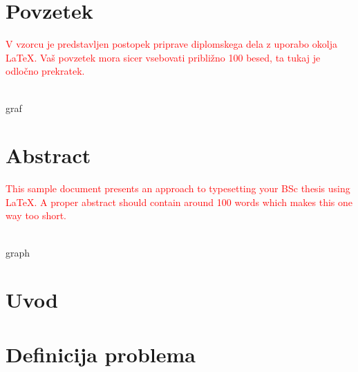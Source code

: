 \documentclass[a4paper, 12pt, ]{book}
\newcommand{\TODO}[1]{\textcolor{red}{#1}}
\newcommand{\clearemptydoublepage}{\newpage{\pagestyle{empty}\cleardoublepage}}
\begin{document}
	
	
	
	\chapter*{Povzetek}
	\TODO{V vzorcu je predstavljen postopek priprave diplomskega dela z uporabo okolja \LaTeX.
	Vaš povzetek mora sicer vsebovati približno 100 besed, ta tukaj je odločno prekratek.}
	
	\vspace{2cm}
	\\
	graf
	
	
	\clearemptydoublepage
	
	
	
	
	
	\chapter*{Abstract}
	\TODO{This sample document presents an approach to typesetting your BSc thesis using \LaTeX. A 
	proper abstract should contain around 100 words which makes this one way too short.}
	
	\vspace{2cm}
	\\
	graph
	
	\clearemptydoublepage




\mainmatter
\setcounter{page}{1}
\pagestyle{fancy}



\chapter{Uvod}





\chapter{Definicija problema}
\end{document}

